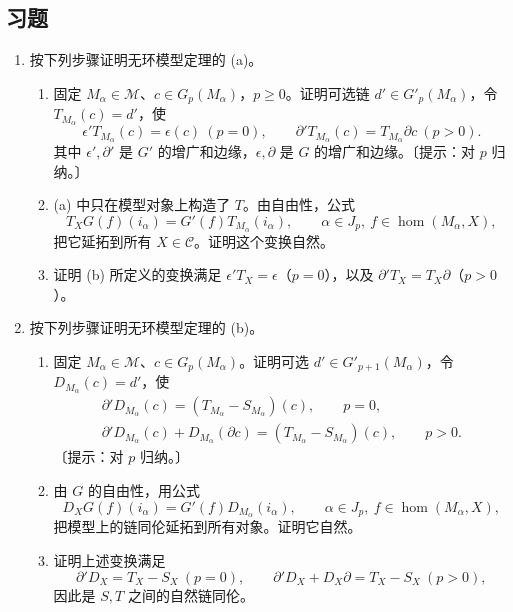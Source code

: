 \subsection*{习题}
\begin{enumerate}
\item 按下列步骤证明无环模型定理的 (a)。
\begin{enumerate}[label=(\alph*)]
\item 固定 $M_\alpha\in\mathcal M$、$c\in G_p(M_\alpha)$，$p\ge0$。证明可选链 $d'\in G'_p(M_\alpha)$，令 $T_{M_\alpha}(c)=d'$，使
\[
\epsilon'T_{M_\alpha}(c)=\epsilon(c)\ (p=0),\qquad
\partial'T_{M_\alpha}(c)=T_{M_\alpha}\partial c\ (p>0).
\]
其中 $\epsilon',\partial'$ 是 $G'$ 的增广和边缘，$\epsilon,\partial$ 是 $G$ 的增广和边缘。〔提示：对 $p$ 归纳。〕
\item (a) 中只在模型对象上构造了 $T$。由自由性，公式
\[
T_XG(f)(i_\alpha)=G'(f)T_{M_\alpha}(i_\alpha),\qquad
\alpha\in J_p,\ f\in\operatorname{hom}(M_\alpha,X),
\]
把它延拓到所有 $X\in\mathcal C$。证明这个变换自然。
\item 证明 (b) 所定义的变换满足 $\epsilon'T_X=\epsilon$（$p=0$），以及 $\partial'T_X=T_X\partial$（$p>0$）。
\end{enumerate}
\item 按下列步骤证明无环模型定理的 (b)。
\begin{enumerate}[label=(\alph*)]
\item 固定 $M_\alpha\in\mathcal M$、$c\in G_p(M_\alpha)$。证明可选 $d'\in G'_{p+1}(M_\alpha)$，令 $D_{M_\alpha}(c)=d'$，使
\begin{gather*}
\partial'D_{M_\alpha}(c)=(T_{M_\alpha}-S_{M_\alpha})(c),\qquad p=0,\\
\partial'D_{M_\alpha}(c)+D_{M_\alpha}(\partial c)=(T_{M_\alpha}-S_{M_\alpha})(c),\qquad p>0.
\end{gather*}
〔提示：对 $p$ 归纳。〕
\item 由 $G$ 的自由性，用公式
\[
D_XG(f)(i_\alpha)=G'(f)D_{M_\alpha}(i_\alpha),\qquad
\alpha\in J_p,\ f\in\operatorname{hom}(M_\alpha,X),
\]
把模型上的链同伦延拓到所有对象。证明它自然。
\item[(d)] 证明上述变换满足
\[
\partial'D_X=T_X-S_X\ (p=0),\qquad
\partial'D_X+D_X\partial=T_X-S_X\ (p>0),
\]
因此是 $S,T$ 之间的自然链同伦。
\end{enumerate}

\end{enumerate}
